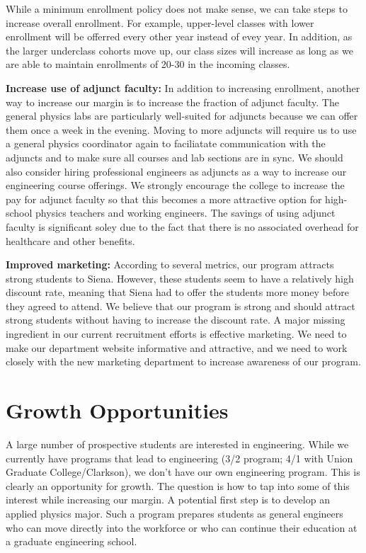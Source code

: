 \documentclass[12pt]{article}
\begin{document}
While a minimum enrollment policy does not make sense, we can take steps to increase overall enrollment.  For example, 
upper-level classes with lower enrollment will be offerred every other year instead of evey year.  In addition, as the larger underclass cohorts move up, our class sizes will increase as long as we are able to maintain enrollments of 20-30 in the incoming classes.

{\bf Increase use of adjunct faculty:} 
In addition to increasing enrollment, another way to increase our margin is to increase the fraction of adjunct faculty.  The general physics labs are particularly well-suited for adjuncts because we can offer them once a week in the evening.  Moving to more adjuncts will require us to use a general physics coordinator again to faciliatate communication with the adjuncts and to make sure all courses and lab sections are in sync.  We should also consider hiring professional engineers as adjuncts as a way to increase our engineering course offerings.  We strongly encourage the college to increase the pay for adjunct faculty so that this becomes a more attractive option for high-school physics teachers and working engineers.  The savings of using adjunct faculty is significant soley due to the fact that there is no associated overhead for healthcare and other benefits.

{\bf Improved marketing:}  According to several metrics, our program attracts strong students to Siena.  However, these students seem to have a relatively high discount rate, meaning that Siena had to offer the students more money before they agreed to attend.  We believe that our program is strong and should attract strong students without having to increase the discount rate.  A major missing ingredient in our current recruitment efforts is effective marketing.  We need to make our department website informative and attractive, and we need to work closely with the new marketing department to increase awareness of our program.  

\newpage
\section{Growth Opportunities}
\vspace*{-.2in}
A large number of prospective students are interested in engineering.  While we currently 
have programs that lead to engineering (3/2 program; 4/1 with Union Graduate College/Clarkson),
we don't have our own engineering program.  This is clearly an opportunity for growth.  The question is
how to tap into some of this interest while increasing our margin.  A potential first step is to develop
an applied physics major.  Such a program prepares students as general engineers who can move directly into the workforce or who can continue their education at a graduate engineering school.
\end{document}
